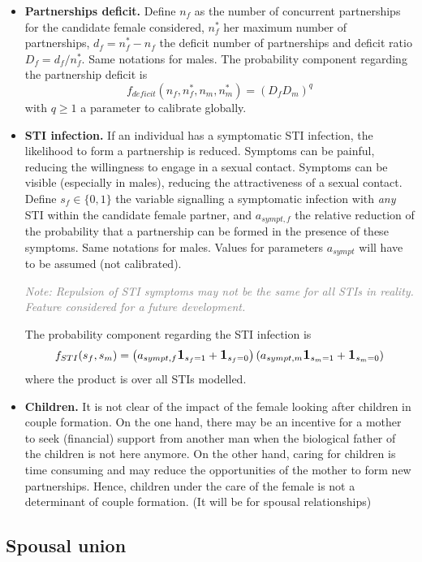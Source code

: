 \documentclass[11pt, onecolumn]{article}
\newcommand{\one}[1]{\textbf{\large{1}}_{#1}}
\newcommand{\note}[1]{\textit{\textcolor{Grey}{Note: #1}}}
\begin{document}
\begin{itemize}
\item \textbf{Partnerships deficit.} Define $n_f$ as the number of concurrent partnerships for the candidate female considered, $n^*_f$ her maximum number of partnerships, $d_f=n^*_f-n_f$ the deficit number of partnerships and deficit ratio $D_f=d_f/n^*_f$. Same notations for males. The probability component regarding the partnership deficit is
$$ f_{deficit}(n_f,n^*_f,n_m,n^*_m) = (D_f D_m)^q$$
with $q\geq 1$ a parameter to calibrate globally.

\item \textbf{STI infection.} If an individual has a symptomatic STI infection, the likelihood to form a partnership is reduced. Symptoms can be painful, reducing the willingness to engage in a sexual contact. Symptoms can be visible (especially in males), reducing the attractiveness of a sexual contact. Define $s_f\in\{0,1\}$ the variable signalling a symptomatic infection with \emph{any} STI within the candidate female partner, and $a_{sympt,f}$ the relative reduction of the probability that a partnership can be formed in the presence of these symptoms. Same notations for males. Values for parameters $a_{sympt}$ will have to be assumed (not calibrated). 

\note{Repulsion of STI symptoms may not be the same for all STIs in reality. Feature considered for a future development.}

The probability component regarding the STI infection is
$$ f_{STI}(s_f,s_m)= \left(a_{sympt,f} \one{s_f=1} +\one{s_f=0}\right) \left(a_{sympt,m} \one{s_m=1} +\one{s_m=0}\right)$$
where the product is over all STIs modelled.


\item \textbf{Children.} It is not clear of the impact of the female looking after children in couple formation. On the one hand, there may be an incentive for a mother to seek (financial) support from another man when the biological father of the children is not here anymore. On the other hand, caring for children is time consuming and may reduce the opportunities of the mother to form new partnerships. Hence, children under the care of the female is not a determinant of couple formation. (It will be for spousal relationships)

\end{itemize}




\subsection{Spousal union}
\end{document}
